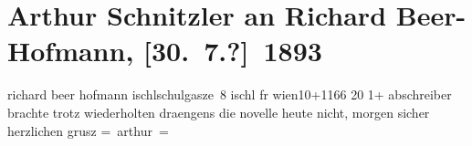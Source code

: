 

         
         \renewcommand{\erwaehntePersonen}{Personen:  ?? [Schreibkraft für Arthur Schnitzler], Richard Beer-Hofmann}
         \renewcommand{\erwaehnteOrte}{Orte: Bad Ischl, Schulgasse, Wien}
         \renewcommand{\erwaehnteWerke}{Werke: Das Kind}
               \section[Arthur Schnitzler an Richard Beer-Hofmann, {[}30. 7.?{]} 1893]{ Arthur Schnitzler an Richard Beer-Hofmann, {[}30. 7.?{]} 1893}\nopagebreak{}\rehead{ }\begin{ledgroupsized}[t]{13cm}\normalsize\beginnumbering \toendnotes[C]{\smallbreak\pagebreak[2]} 
\toendnotes[C]{\smallbreak}\pstart{}{\pb}richard beer hofmann ischl\pend{}\pstart{}schulgasze 8\pend{}{\bigskip}\pstart
           \noindent{}{\pb}ischl fr wien10+1166{ }20{ }1+\pend
           \pstart
           abschreiber brachte trotz
               wiederholten draengens die novelle heute nicht, morgen sicher\pend
           \pstart herzlichen grusz \spacefill\mbox{= arthur =}\pend{}
         
         \endnumbering{}\end{ledgroupsized}  \newcommand{\dateiname}{L00247}\newcommand{\titel}{Arthur Schnitzler an Richard Beer-Hofmann, [30. 7.?] 1893}\newcommand{\editorInnen}{Martin Anton Müller und Gerd-Hermann Susen}
      